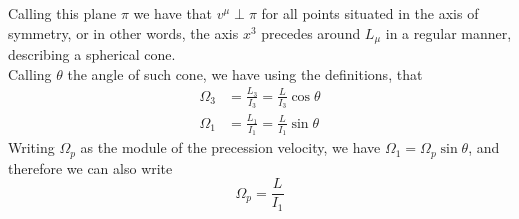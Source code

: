 \documentclass[../admech.tex]{subfiles}
\begin{document}
Calling this plane $\pi$ we have that $v^\mu\perp\pi$ for all points situated in the axis of symmetry, or in other words, the axis $x^3$ precedes around $L_\mu$ in a regular manner, describing a spherical cone.\\
Calling $\theta$ the angle of such cone, we have using the definitions, that
\begin{equation}
	\begin{aligned}
		\Omega_3&=\frac{L_3}{I_3}=\frac{L}{I_3}\cos\theta\\
		\Omega_1&=\frac{L_1}{I_1}=\frac{L}{I_1}\sin\theta
	\end{aligned}
	\label{eq:sphericaltop}
\end{equation}
Writing $\Omega_p$ as the module of the precession velocity, we have $\Omega_1=\Omega_p\sin\theta$, and therefore we can also write
\begin{equation}
	\Omega_p=\frac{L}{I_1}
	\label{eq:precessionvel}
\end{equation}
\end{document}
